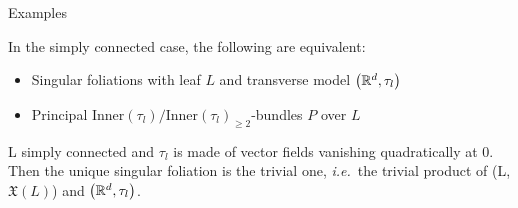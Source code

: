 \documentclass[
aspectratio=3218, 
10pt
]{beamer}
\theoremstyle{plain}
\theoremstyle{remark}
\begin{document}

\begin{frame}{Examples}
\begin{theorem}[{[C.\ L.-G., S.-R.\ F.]}]\vspace{.5pt}
In the simply connected case, the following are equivalent:
\begin{itemize}
	\item Singular foliations with leaf $L$ and transverse model $\mleft(\mathbb{R}^d, \tau_l\mright)$
	\item Principal $\mathrm{Inner}(\tau_l)/\mathrm{Inner}(\tau_l)_{\geq 2}$-bundles $P$ over $L$
\end{itemize}
\end{theorem}

\begin{corollary}\vspace{.5pt}
L simply connected and $\tau_l$ is made of vector fields vanishing quadratically at 0. Then the unique singular foliation is the trivial one, \textit{i.e.}\ the trivial product of (L, $\mathfrak{X}(L)$) and $\mleft(\mathbb{R}^d, \tau_l \mright)$.
\end{corollary}
\end{frame}

\end{document}
